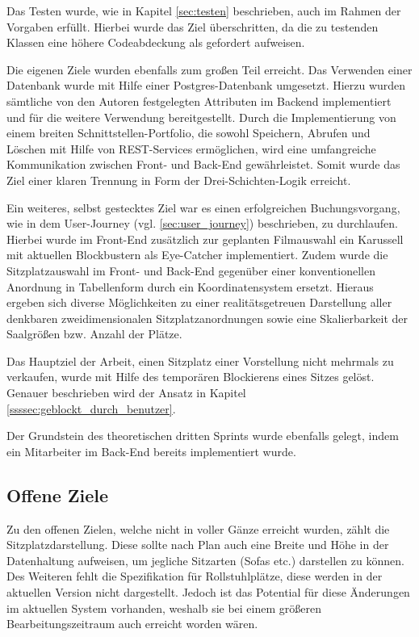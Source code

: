 Das Testen wurde, wie in Kapitel \vref{sec:testen} beschrieben, auch im Rahmen der Vorgaben erfüllt. Hierbei wurde das Ziel überschritten, da die zu testenden Klassen eine höhere Codeabdeckung als gefordert aufweisen.

Die eigenen Ziele wurden ebenfalls zum großen Teil erreicht. Das Verwenden einer Datenbank wurde mit Hilfe einer Postgres-Datenbank umgesetzt.
Hierzu wurden sämtliche von den Autoren festgelegten Attributen im Backend implementiert und für die weitere Verwendung bereitgestellt.
Durch die Implementierung von einem breiten Schnittstellen-Portfolio, die sowohl Speichern, Abrufen und Löschen mit Hilfe von \acs{REST}-Services ermöglichen, wird eine umfangreiche Kommunikation zwischen Front- und Back-End gewährleistet.
Somit wurde das Ziel einer klaren Trennung in Form der Drei-Schichten-Logik erreicht.

Ein weiteres, selbst gestecktes Ziel war es einen erfolgreichen Buchungsvorgang, wie in dem User-Journey (vgl. \vref{sec:user_journey}) beschrieben, zu durchlaufen.
Hierbei wurde im Front-End zusätzlich zur geplanten Filmauswahl ein Karussell mit aktuellen Blockbustern als Eye-Catcher implementiert.
Zudem wurde die Sitzplatzauswahl im Front- und Back-End gegenüber einer konventionellen Anordnung in Tabellenform durch ein Koordinatensystem ersetzt.
Hieraus ergeben sich diverse Möglichkeiten zu einer realitätsgetreuen Darstellung aller denkbaren zweidimensionalen Sitzplatzanordnungen sowie eine Skalierbarkeit der Saalgrößen bzw. Anzahl der Plätze.

Das Hauptziel der Arbeit, einen Sitzplatz einer Vorstellung nicht mehrmals zu verkaufen, wurde mit Hilfe des temporären Blockierens eines Sitzes gelöst. 
Genauer beschrieben wird der Ansatz in Kapitel \vref{ssssec:geblockt_durch_benutzer}.

Der Grundstein des theoretischen dritten Sprints wurde ebenfalls gelegt, indem ein Mitarbeiter im Back-End bereits implementiert wurde.


\subsection{Offene Ziele}

Zu den offenen Zielen, welche nicht in voller Gänze erreicht wurden, zählt die Sitzplatzdarstellung.
Diese sollte nach Plan auch eine Breite und Höhe in der Datenhaltung aufweisen, um jegliche Sitzarten (Sofas etc.) darstellen zu können.
Des Weiteren fehlt die Spezifikation für Rollstuhlplätze, diese werden in der aktuellen Version nicht dargestellt.
Jedoch ist das Potential für diese Änderungen im aktuellen System vorhanden, weshalb sie bei einem größeren Bearbeitungszeitraum auch erreicht worden wären.

